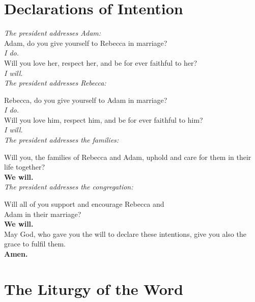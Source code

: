 \documentclass[a4paper,10pt,titlepage]{article}
\begin{document}
\clearpage 

\section{Declarations of Intention}

{\em The president addresses Adam:}\\
Adam, do you give yourself to Rebecca in marriage? \\

{\em I do.} \\

Will you love her, respect her, and be for ever faithful to her? \\

{\em I will.}\\

{\em The president addresses Rebecca:} 

Rebecca, do you give yourself to Adam in marriage?\\

{\em I do.}\\

Will you love him, respect him, and be for ever faithful to him?\\ 

{\em I will.}\\

{\em The president addresses the families:}

Will you, the families of Rebecca and Adam, 
uphold and care for them in their life together?\\

{\bf We will.}\\

{\em The president addresses the congregation:}

Will all of you support and encourage Rebecca and\\ Adam in their marriage?\\

{\bf We will.}\\

May God, who gave you the will to declare these intentions, give you also the 
grace to fulfil them.\\

{\bf Amen.}

\clearpage
\section{The Liturgy of the Word}
\end{document}
